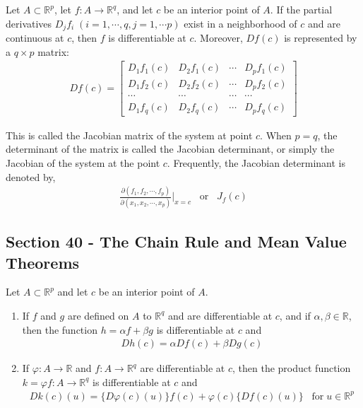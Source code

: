 \documentclass[12pt]{article}
\newcommand{\R}{\mathbb{R}}
\newenvironment{theorem}[2][Theorem]{\begin{trivlist}
\item[\hskip \labelsep {\bfseries #1}\hskip \labelsep {\bfseries #2.}]}{\end{trivlist}}
\begin{document}
\begin{theorem}{39.9}
Let $A \subset \R^p$, let $f: A \to \R^q$, and let $c$ be an interior point of $A$. If the partial derivatives $D_jf_i \; (i = 1, \cdots, q, j = 1, \cdots p)$ exist in a neighborhood of $c$ and are continuous at $c$, then $f$ is differentiable at $c$. Moreover, $Df(c)$ is represented by a $q \times p$ matrix:
\begin{align*}
Df(c) = \begin{bmatrix}
D_1f_1(c) & D_2f_1(c) & \cdots & D_pf_1(c)\\
D_1f_2(c) & D_2f_2(c) & \cdots & D_pf_2(c)\\
\cdots & \cdots & \cdots & \cdots\\
D_1f_q(c) & D_2f_q(c) & \cdots & D_pf_q(c)
\end{bmatrix}
\end{align*}

This is called the Jacobian matrix of the system at point $c$. When $p = q$, the determinant of the matrix is called the Jacobian determinant, or simply the Jacobian of the system at the point $c$. Frequently, the Jacobian determinant is denoted by,
\begin{align*}
\frac{\partial(f_1, f_2, \cdots, f_p)}{\partial(x_1, x_2, \cdots, x_p)} \bigg\rvert_{x = c} \; \; \; \text{or} \; \; \; J_f(c)
\end{align*}
\end{theorem}
\newpage
\subsection*{Section 40 - The Chain Rule and Mean Value Theorems}

\begin{theorem}{40.1}
Let $A \subset \R^p$ and let $c$ be an interior point of $A$.
\begin{enumerate}[label=\alph*)]
\item If $f$ and $g$ are defined on $A$ to $\R^q$ and are differentiable at $c$, and if $\alpha, \beta \in \R$, then the function $h = \alpha f + \beta g$ is differentiable at $c$ and 
\begin{align*}
Dh(c) = \alpha Df(c) + \beta Dg(c)
\end{align*}
\item If $\varphi: A \to \R$ and $f: A \to \R^q$ are differentiable at $c$, then the product function $k = \varphi f: A \to \R^q$ is differentiable at $c$ and 
\begin{align*}
Dk(c)(u) = \{D\varphi(c)(u)\}f(c) + \varphi(c)\{Df(c)(u)\} \; \; \; \text{for} \; u \in \R^p
\end{align*}
\end{enumerate}
\end{theorem}
\end{document}
